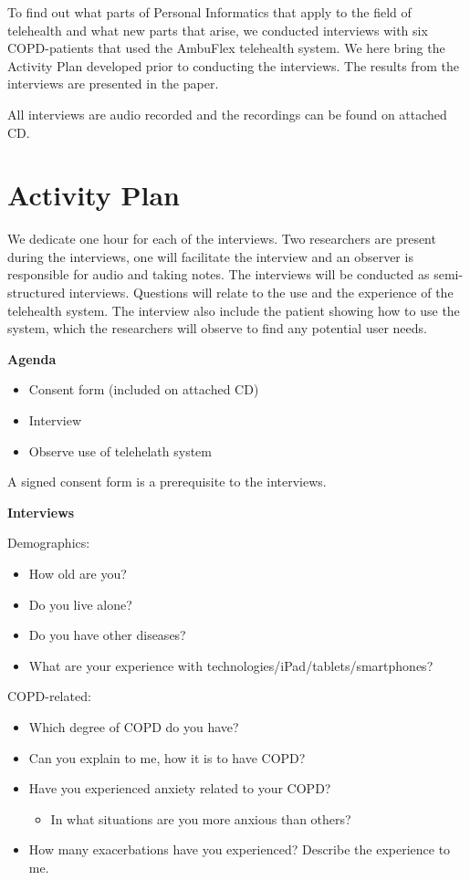 To find out what parts of Personal Informatics that apply to the field of telehealth and what new parts that arise, we conducted interviews with six COPD-patients that used the AmbuFlex telehealth system. We here bring the Activity Plan developed prior to conducting the interviews. The results from the interviews are presented in the paper.


All interviews are audio recorded and the recordings can be found on attached CD.

\section{Activity Plan}
We dedicate one hour for each of the interviews. Two researchers are present during the interviews, one will facilitate the interview and an observer is responsible for audio and taking notes.  The interviews will be conducted as semi-structured interviews. Questions will relate to the use and the experience of the telehealth system. The interview also include the patient showing how to use the system, which the researchers will observe to find any potential user needs.

\textbf{Agenda}
\begin{itemize}
	\item Consent form (included on attached CD)
	\item Interview
	\item Observe use of telehelath system
\end{itemize}

A signed consent form is a prerequisite to the interviews.

\textbf{Interviews}

Demographics:
\begin{itemize}
	\item How old are you?
	\item Do you live alone?
	\item Do you have other diseases?
	\item What are your experience with technologies/iPad/tablets/smartphones?
\end{itemize}

COPD-related:
\begin{itemize}
	\item Which degree of COPD do you have?
	\item Can you explain to me, how it is to have COPD?
	\item Have you experienced anxiety related to your COPD?
	\begin{itemize}
		\item In what situations are you more anxious than others?
	\end{itemize}
	\item How many exacerbations have you experienced? Describe the experience to me.
\end{itemize}


